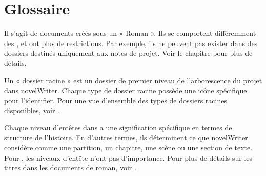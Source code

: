 \documentclass[a4paper,11pt,french]{sphinxmanual}
\begin{document}
\chapter{Glossaire}
\label{\detokenize{int_glossary:glossary}}\label{\detokenize{int_glossary:a-glossary}}\label{\detokenize{int_glossary::doc}}\begin{description}
\sphinxAtStartPar
Il s’agit de documents créés sous un {\hyperref[\detokenize{int_glossary:term-Root-Folder}]{}} « Roman ». Ils se comportent différemment des {\hyperref[\detokenize{int_glossary:term-Project-Notes}]{}}, et ont plus de restrictions. Par exemple, ils ne peuvent pas exister dans des dossiers destinés uniquement aux notes de projet. Voir le chapitre {\hyperref[\detokenize{project_structure:a-struct}]{}} pour plus de détails.

\sphinxAtStartPar
Un « dossier racine » est un dossier de premier niveau de l’arborescence du projet dans novelWriter. Chaque type de dossier racine possède une icône spécifique pour l’identifier. Pour une vue d’ensemble des types de dossiers racines disponibles, voir {\hyperref[\detokenize{project_overview:a-proj-roots}]{}}.

\sphinxAtStartPar
Chaque niveau d’en\sphinxhyphen{}têtes dans {\hyperref[\detokenize{int_glossary:term-Novel-Documents}]{}} a une signification spécifique en termes de structure de l’histoire. En d’autres termes, ils déterminent ce que novelWriter considère comme une partition, un chapitre, une scène ou une section de texte. Pour {\hyperref[\detokenize{int_glossary:term-Project-Notes}]{}}, les niveaux d’en\sphinxhyphen{}tête n’ont pas d’importance. Pour plus de détails sur les titres dans les documents de roman, voir {\hyperref[\detokenize{project_structure:a-struct-heads}]{}}.


\end{description}
\end{document}
